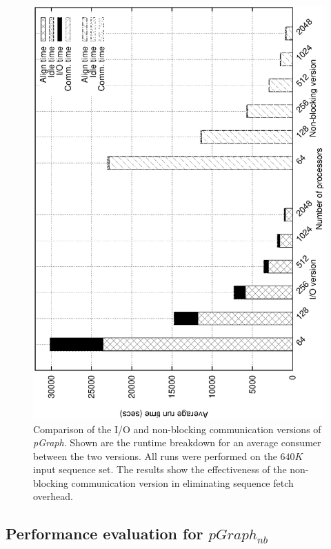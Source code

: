 \documentclass[10pt,journal,letterpaper,compsoc]{IEEEtran}
\begin{document}
\begin{figure}[thb]
\centerline{
						\includegraphics[angle=-90, scale=0.35]{csBreak.eps}
            }
\caption{
Comparison of the I/O and non-blocking communication versions of {\it pGraph}.  Shown are the runtime breakdown for an average consumer between the two versions. All runs were performed on the $640K$ input sequence set. The results show the effectiveness of the non-blocking communication version in eliminating sequence fetch overhead.
}
\label{figConsumerBreakdown}
\end{figure}

\subsection{Performance evaluation for $pGraph_{nb}$}
\label{secPerf}
\end{document}
